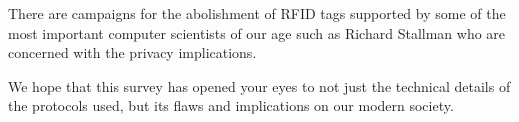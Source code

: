 \documentclass[12pt]{article}
\begin{document}
There are campaigns for the abolishment of RFID tags supported by some of the most important computer scientists of our age such as Richard Stallman who are concerned with the privacy implications.

We hope that this survey has opened your eyes to not just the technical details of the protocols used, but its flaws and implications on our modern society.
\cleardoublepage


 










\end{document}
